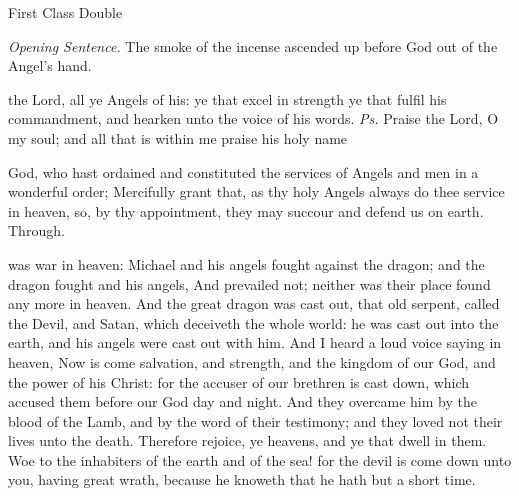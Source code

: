\begin{inhead}
    {First Class Double}
\end{inhead}
\par\noindent
\textit{Opening Sentence.} The smoke of the incense ascended up before God out of the Angel's hand.

\introit
{} the Lord, all ye Angels of his: ye that excel in strength ye that fulfil his commandment, and hearken unto the voice of his words. \textit{Ps.} Praise the Lord, O my soul; and all that is within me praise his holy name

\collect
{} God, who hast ordained and constituted the services of Angels and men in a wonderful order; Mercifully grant that, as thy holy Angels always do thee service in heaven, so, by thy appointment, they may succour and defend us on earth. Through.

 was war in heaven: Michael and his angels fought against the dragon; and the dragon fought and his angels, And prevailed not; neither was their place found any more in heaven. And the great dragon was cast out, that old serpent, called the Devil, and Satan, which deceiveth the whole world: he was cast out into the earth, and his angels were cast out with him. And I heard a loud voice saying in heaven, Now is come salvation, and strength, and the kingdom of our God, and the power of his Christ: for the accuser of our brethren is cast down, which accused them before our God day and night. And they overcame him by the blood of the Lamb, and by the word of their testimony; and they loved not their lives unto the death. Therefore rejoice, ye heavens, and ye that dwell in them. Woe to the inhabiters of the earth and of the sea! for the devil is come down unto you, having great wrath, because he knoweth that he hath but a short time.


